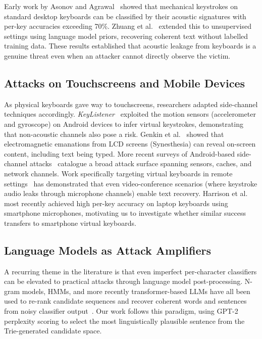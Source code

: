 \documentclass[conference]{IEEEtran}
\begin{document}
Early work by Asonov and Agrawal~\cite{asonov2004keyboard} showed that mechanical keystrokes on standard desktop keyboards can be classified by their acoustic signatures with per-key accuracies exceeding 70\%. Zhuang et al.~\cite{zhuang2009keyboard} extended this to unsupervised settings using language model priors, recovering coherent text without labelled training data. These results established that acoustic leakage from keyboards is a genuine threat even when an attacker cannot directly observe the victim.

\subsection{Attacks on Touchscreens and Mobile Devices}

As physical keyboards gave way to touchscreens, researchers adapted side-channel techniques accordingly. \textit{KeyListener}~\cite{lu2019keylistener} exploited the motion sensors (accelerometer and gyroscope) on Android devices to infer virtual keystrokes, demonstrating that non-acoustic channels also pose a risk. Genkin et al.~\cite{genkin2019synesthesia} showed that electromagnetic emanations from LCD screens (Synesthesia) can reveal on-screen content, including text being typed. More recent surveys of Android-based side-channel attacks~\cite{android2023} catalogue a broad attack surface spanning sensors, caches, and network channels. Work specifically targeting virtual keyboards in remote settings~\cite{retrieving2021} has demonstrated that even video-conference scenarios (where keystroke audio leaks through microphone channels) enable text recovery. Harrison et al.~\cite{harrison2023} most recently achieved high per-key accuracy on laptop keyboards using smartphone microphones, motivating us to investigate whether similar success transfers to smartphone virtual keyboards.

\subsection{Language Models as Attack Amplifiers}

A recurring theme in the literature is that even imperfect per-character classifiers can be elevated to practical attacks through language model post-processing. N-gram models, HMMs, and more recently transformer-based LLMs have all been used to re-rank candidate sequences and recover coherent words and sentences from noisy classifier output~\cite{zhuang2009keyboard, harrison2023}. Our work follows this paradigm, using GPT-2 perplexity scoring to select the most linguistically plausible sentence from the Trie-generated candidate space.
\end{document}
